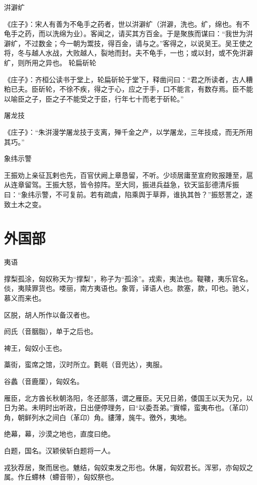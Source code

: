 \documentclass[a4paper,12pt,UTF8,twoside]{ctexbook}
\begin{document}
    洴澼纩
    
    《庄子》：宋人有善为不龟手之药者，世以洴澼纩（洴澼，洗也。纩，绵也。有不龟手之药，而以洗绵为业）。客闻之，请买其方百金。于是聚族而谋曰：“我世为洴澼纩，不过数金；今一朝为鬻技，得百金，请与之。”客得之，以说吴王。吴王使之将，冬与越人水战，大败越人，裂地而封。夫不龟手，一也；或以封，或不免洴澼纩，则所用之异也。
    轮扁斫轮
    
    《庄子》：齐桓公读书于堂上，轮扁斫轮于堂下，释凿问曰：“君之所读者，古人糟粕已夫。臣斫轮，不徐不疾，得之于心，应之于手，口不能言，有数存焉。臣不能以喻臣之子，臣之子不能受之于臣，行年七十而老于斫轮。”
    
    屠龙技
    
    《庄子》：“朱洴漫学屠龙技于支离，殚千金之产，以学屠龙，三年技成，而无所用其巧。”
    
    象纬示警
    
    王振劝上亲征瓦剌也先，百官伏阙上章恳留，不听。少顷居庸至宣府败报踵至，扈从连章留驾。王振大怒，皆令掠阵。至大同，振进兵益急，钦天监彭德清斥振曰：“象纬示警，不可复前。若有疏虞，陷乘舆于草莽，谁执其咎？”振怒詈之，遂致土木之变。
    
    \part{外国部}
    
    夷语
    
    撑梨孤涂，匈奴称天为“撑梨”，称子为“孤涂”。戎索，夷法也。鞮鞻，夷乐官名。倓，夷赎罪货也。喽丽，南方夷语也。象胥，译语人也。款塞，款，叩也。驰义，慕义而来也。
    
    区脱，胡人所作以备汉者也。
    
    阏氏（音胭脂），单于之后也。
    
    裨王，匈奴小王也。
    
    藁街，蛮席之馆，汉时所立。氀毼（音兜达），夷服。
    
    谷蠡（音鹿厘），匈奴名。
    
    雁臣，北方酋长秋朝洛阳，冬还部落，谓之雁臣。天兄日弟，倭国王以天为兄，以日为弟。未明时出听政，日出便停理务，曰“以委吾弟。”賨幪，蛮夷布也。（革卬）角，朝鲜列水之间白（革卬）角。貗薄，旄牛。徼外，夷地。
    
    绝幕，幕，沙漠之地也，直度曰绝。
    
    白题，国名。汉颖侯斩白题将一人。
    
    戎狄荐居，聚而居也。魋结，匈奴束发之形也。休屠，匈奴君长。浑邪，亦匈奴之属。作丘螮林（螮音带），匈奴祭也。
    
\end{document}
